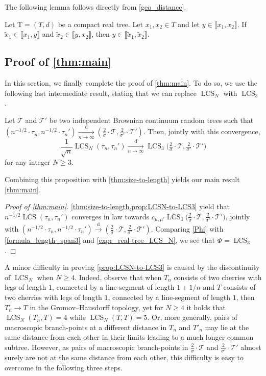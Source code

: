 \documentclass[11pt,reqno]{amsart}
\newcommand{\1}{\mathbf{1}}
\newcommand{\0}{\mathbf{0}}
\newcommand{\rT}{\mathrm{T}}
\newcommand{\sT}{\mathscr{T}}
\newcommand{\convdist}{\ensuremath{\stackrel{\mathrm{d}}{\rightarrow}}}
\newcommand{\LCS}{\operatorname{LCS}}
\begin{document}
The following lemma follows directly from \eqref{geo_distance}. 
\begin{lem}
\label{5points_1path} 
Let $\rT=(T,d)$ be a compact real tree. Let $x_1,x_2\in T$ and let $y\in\llbracket x_1,x_2\rrbracket$. If $\tilde{x}_1\in\llbracket x_1,y\rrbracket$ and $\tilde{x}_2\in \llbracket y,x_2\rrbracket$, then $y\in\llbracket \tilde{x}_1,\tilde{x}_2\rrbracket$.
\end{lem}

\subsection{Proof of \cref{thm:main}}\label{sec:proof_main} In this section, we finally complete the proof of \cref{thm:main}. To do so, we use the following last intermediate result, stating that we can replace $\LCS_N$ with $\LCS_3$.


\begin{prop}\label{prop:LCSN-to-LCS3}
    Let $\sT$ and $\sT'$ be two independent Brownian continuum random trees such that $(n^{-1/2}\cdot\tau_n,n^{-1/2}\cdot\tau_n') \xrightarrow[n\to\infty]{\mathrm d}  (\frac{2}{\sigma}\cdot\sT, \frac{2}{\sigma'}\cdot\sT')$. Then, jointly with this convergence,
\[\frac{1}{\sqrt{n}}\LCS_N(\tau_n,\tau_n') \xrightarrow[n\to\infty]{\mathrm d} \LCS_3\big(\tfrac{2}{\sigma}\cdot \sT,\tfrac{2}{\sigma'}\cdot \sT'\big)\] 
for any integer $N\geq 3$. 
\end{prop}

Combining this proposition with \cref{thm:size-to-length} yields our main result \cref{thm:main}.

\begin{proof}[Proof of \cref{thm:main}]
     \cref{thm:size-to-length,prop:LCSN-to-LCS3} yield that $n^{-1/2}\LCS(\tau_n,\tau_n')$ converges in law towards $c_{\mu,\mu'}\LCS_3\big(\tfrac{2}{\sigma}\cdot \sT,\tfrac{2}{\sigma'}\cdot \sT'\big)$, jointly with $(n^{-1/2}\cdot\tau_n,n^{-1/2}\cdot\tau_n') \convdist (\frac{2}{\sigma}\cdot\sT, \frac{2}{\sigma'}\cdot\sT')$. Comparing \eqref{Phi} with \eqref{formula_length_span3} and \eqref{expr_real-tree_LCS_N}, we see that $\Phi = \LCS_3$.
\end{proof}

A minor difficulty in proving \cref{prop:LCSN-to-LCS3} is caused by the discontinuity of $\LCS_N$ when $N\geq 4$. Indeed, observe that when $T_n$ consists of two cherries with legs of length $1$, connected by a line-segment of length $1+1/n$ and $T$ consists of two cherries with legs of length $1$, connected by a line-segment of length $1$, then $T_n\to T$ in the Gromov--Hausdorff topology, yet for $N\ge 4$ it holds that $\LCS_N(T_n,T)=4$ while $\LCS_N(T,T)=5$. Or, more generally, pairs of macroscopic branch-points at a different distance in $T_n$ and $T'_n$ may lie at the same distance from each other in their limits leading to a much longer common subtree. However, as pairs of macroscopic branch-points in $\frac{2}{\sigma}\cdot\sT$ and $\frac{2}{\sigma'}\cdot\sT'$ almost surely are not at the same distance from each other, this difficulty is easy to overcome in the following three steps.
\end{document}
